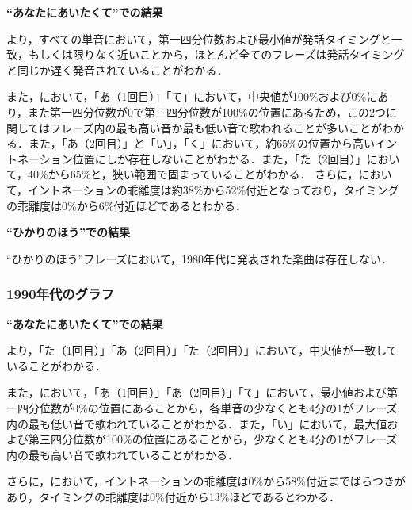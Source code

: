 \textbf{“あなたにあいたくて”での結果}\par
{}より，すべての単音において，第一四分位数および最小値が発話タイミングと一致，もしくは限りなく近いことから，ほとんど全てのフレーズは発話タイミングと同じか遅く発音されていることがわかる．\par
また，において，「あ（1回目）」「て」において，中央値が100\%および0\%にあり，また第一四分位数が0で第三四分位数が100\%の位置にあるため，この2つに関してはフレーズ内の最も高い音か最も低い音で歌われることが多いことがわかる．また，「あ（2回目）」と「い」，「く」において，約65\%の位置から高いイントネーション位置にしか存在しないことがわかる．また，「た（2回目）」において，40\%から65\%と，狭い範囲で固まっていることがわかる．
さらに，において，イントネーションの乖離度は約38\%から52\%付近となっており，タイミングの乖離度は0\%から6\%付近ほどであるとわかる．


\textbf{“ひかりのほう”での結果}\par
“ひかりのほう”フレーズにおいて，1980年代に発表された楽曲は存在しない．


\subsubsection{1990年代のグラフ}

\textbf{“あなたにあいたくて”での結果}\par
{}より，「た（1回目）」「あ（2回目）」「た（2回目）」において，中央値が一致していることがわかる．\par
また，において，「あ（1回目）」「あ（2回目）」「て」において，最小値および第一四分位数が0\%の位置にあることから，各単音の少なくとも4分の1がフレーズ内の最も低い音で歌われていることがわかる．また，「い」において，最大値および第三四分位数が100\%の位置にあることから，少なくとも4分の1がフレーズ内の最も高い音で歌われていることがわかる．\par
さらに，において，イントネーションの乖離度は0\%から58\%付近までばらつきがあり，タイミングの乖離度は0\%付近から13\%ほどであるとわかる．


